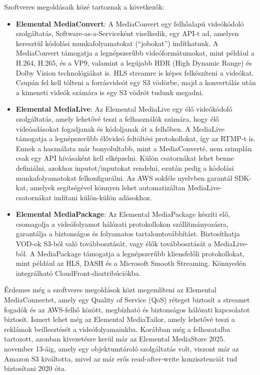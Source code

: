 Szoftveres megoldásaik közé tartoznak a következők: 

\begin{itemize}
  \item \textbf{Elemental MediaConvert}: A MediaConvert egy felhőalapú videókódoló szolgáltatás, Software-as-a-Serviceként viselkedik, egy API-t ad, amelyen keresztül kódolási munkafolyamatokat (``jobokat'') indíthatunk. A MediaConvert támogatja a legnépszerűbb videóformátumokat, mint például a H.264, H.265, és a VP9, valamint a legújabb HDR (High Dynamic Range) és Dolby Vision technológiákat is. HLS streamre is képes felkészíteni a videókat. Csupán fel kell tölteni a forrásvideót egy S3 vödörbe, majd a konvertálás után a kimeneti videók számára is egy S3 vödröt tudunk megadni.
  \item \textbf{Elemental MediaLive}: Az Elemental MediaLive egy élő videókódoló szolgáltatás, amely lehetővé teszi a felhasználók számára, hogy élő videóadásokat fogadjanak és kódoljanak át a felhőben. A MediaLive támogatja a legnépszerűbb élővideó feltöltési protokollokat, így az RTMP-t is. Ennek a használata már bonyolultabb, mint a MediaConverté, nem szimplán csak egy API hívásaként kell elképzelni. Külön csatornákat lehet benne definiálni, azokhoz inputot/inputokat rendelni, ezután pedig a kódolási munkafolyamatokat felkonfigurálni. Az AWS sokféle nyelvben garantál SDK-kat, amelyek segítségével könnyen lehet automatizáltan MediaLive-csatornákat indítani külön-külön adásokhoz.
  \item \textbf{Elemental MediaPackage}: Az Elemental MediaPackage készíti elő, csomagolja a videófolyamot hálózati protokollokon szállítmányozásra, garantálja a biztonságos és folyamatos tartalomtovábbítást. Biztosíthatja VOD-ok S3-ból való továbbosztását, vagy élők továbbosztását a MediaLive-ból. A MediaPackage támogatja a legnépszerűbb kliensfelőli protokollokat, mint például az HLS, DASH és a Microsoft Smooth Streaming. Könnyedén integrálható CloudFront-disztribúciókba.
\end{itemize}

Érdemes még a szoftveres megoldások közt megemlíteni az Elemental MediaConnectet, amely egy Quality of Service (QoS) réteget biztosít a streamet fogadók és az AWS-felhő között, megbízható és biztonságos hálózati kapcsolatot biztosít. Ismert lehet még az Elemental MediaTailor, amely lehetővé teszi a reklámok beillesztését a videófolyamainkba. Korábban még a felhozatalba tartozott, azonban kivezetésre kerül már az Elemental MediaStore 2025. november 13-áig, amely egy objektumtároló szolgáltatás volt, viszont már az Amazon S3 kiváltotta, mivel az már erős read-after-write konzisztenciát tud biztosítani 2020 óta. \cite{Mediastore}

